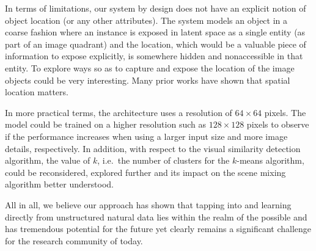 \documentclass[a4paper,12pt]{report}
\begin{document}
In terms of limitations, our system by design does not have an explicit notion of object location (or any other attributes). The system models an object in a coarse fashion where an instance is exposed in latent space as a single entity (as part of an image quadrant) and the location, which would be a valuable piece of information to expose explicitly, is somewhere hidden and nonaccessible in that entity. To explore ways so as to capture and expose the location of the image objects could be very interesting. Many prior works have shown that spatial location matters.

In more practical terms, the architecture uses a resolution of $64 \times 64$ pixels. The model could be trained on a higher resolution such as $128 \times 128$ pixels to observe if the performance increases when using a larger input size and more image details, respectively. In addition, with respect to the visual similarity detection algorithm, the value of $k$, i.e.\ the number of clusters for the $k$-means algorithm, could be reconsidered, explored further and its impact on the scene mixing algorithm better understood.

\vspace{5mm}
All in all, we believe our approach has shown that tapping into and learning directly from unstructured natural data lies within the realm of the possible and has tremendous potential for the future yet clearly remains a significant challenge for the research community of today.




\end{document}
